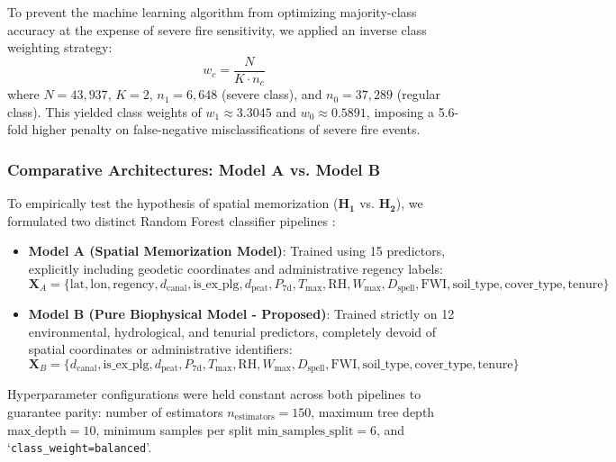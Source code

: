 To prevent the machine learning algorithm from optimizing majority-class accuracy at the expense of severe fire sensitivity, we applied an inverse class weighting strategy:
\begin{equation}
w_c = \frac{N}{K \cdot n_c}
\label{eq:class_weight}
\end{equation}
where $N = 43,937$, $K = 2$, $n_1 = 6,648$ (severe class), and $n_0 = 37,289$ (regular class). This yielded class weights of $w_1 \approx 3.3045$ and $w_0 \approx 0.5891$, imposing a 5.6-fold higher penalty on false-negative misclassifications of severe fire events.

\subsubsection{Comparative Architectures: Model A vs. Model B}
\label{subsubsec:model_architectures}

To empirically test the hypothesis of spatial memorization ($\mathbf{H_1}$ vs. $\mathbf{H_2}$), we formulated two distinct Random Forest classifier pipelines \citep{Breiman2001ML}:
\begin{itemize}
    \item \textbf{Model A (Spatial Memorization Model)}: Trained using 15 predictors, explicitly including geodetic coordinates and administrative regency labels:
    \begin{equation}
    \mathbf{X}_A = \{ \text{lat}, \text{lon}, \text{regency}, d_{\text{canal}}, \text{is\_ex\_plg}, d_{\text{peat}}, P_{\text{7d}}, T_{\text{max}}, \text{RH}, W_{\text{max}}, D_{\text{spell}}, \text{FWI}, \text{soil\_type}, \text{cover\_type}, \text{tenure} \}
    \label{eq:features_a}
    \end{equation}
    \item \textbf{Model B (Pure Biophysical Model - Proposed)}: Trained strictly on 12 environmental, hydrological, and tenurial predictors, completely devoid of spatial coordinates or administrative identifiers:
    \begin{equation}
    \mathbf{X}_B = \{ d_{\text{canal}}, \text{is\_ex\_plg}, d_{\text{peat}}, P_{\text{7d}}, T_{\text{max}}, \text{RH}, W_{\text{max}}, D_{\text{spell}}, \text{FWI}, \text{soil\_type}, \text{cover\_type}, \text{tenure} \}
    \label{eq:features_b}
    \end{equation}
\end{itemize}

Hyperparameter configurations were held constant across both pipelines to guarantee parity: number of estimators $n_{\text{estimators}} = 150$, maximum tree depth $\text{max\_depth} = 10$, minimum samples per split $\text{min\_samples\_split} = 6$, and `\texttt{class\_weight=balanced}'.

